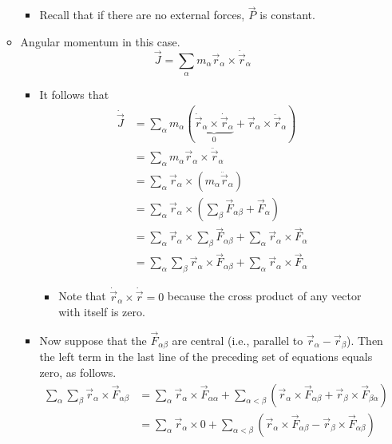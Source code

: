 \documentclass[../notes.tex]{subfiles}
\begin{document}
\begin{itemize}
\begin{itemize}
\begin{itemize}
            \item Recall that if there are no external forces, $\vec{P}$ is constant.
        \end{itemize}
        \item Angular momentum in this case.
        \begin{equation*}
            \vec{J} = \sum_\alpha m_\alpha\vec{r}_\alpha\times\dot{\vec{r}}_\alpha
        \end{equation*}
        \begin{itemize}
            \item It follows that
            \begin{align*}
                \dot{\vec{J}} &= \sum_\alpha m_\alpha(\underbrace{\dot{\vec{r}}_\alpha\times\dot{\vec{r}}_\alpha}_0+\vec{r}_\alpha\times\ddot{\vec{r}}_\alpha)\\
                &= \sum_\alpha m_\alpha\vec{r}_\alpha\times\ddot{\vec{r}}_\alpha\\
                &= \sum_\alpha\vec{r}_\alpha\times(m_\alpha\ddot{\vec{r}}_\alpha)\\
                &= \sum_\alpha\vec{r}_\alpha\times\left( \sum_\beta\vec{F}_{\alpha\beta}+\vec{F}_\alpha \right)\\
                &= \sum_\alpha\vec{r}_\alpha\times\sum_\beta\vec{F}_{\alpha\beta}+\sum_\alpha\vec{r}_\alpha\times\vec{F}_\alpha\\
                &= \sum_\alpha\sum_\beta\vec{r}_\alpha\times\vec{F}_{\alpha\beta}+\sum_\alpha\vec{r}_\alpha\times\vec{F}_\alpha
            \end{align*}
            \begin{itemize}
                \item Note that $\dot{\vec{r}}_\alpha\times\dot{\vec{r}}=0$ because the cross product of any vector with itself is zero.
            \end{itemize}
            \item Now suppose that the $\vec{F}_{\alpha\beta}$ are central (i.e., parallel to $\vec{r}_\alpha-\vec{r}_\beta$). Then the left term in the last line of the preceding set of equations equals zero, as follows.
            \begin{align*}
                \sum_\alpha\sum_\beta\vec{r}_\alpha\times\vec{F}_{\alpha\beta} &= \sum_\alpha\vec{r}_\alpha\times\vec{F}_{\alpha\alpha}+\sum_{\alpha<\beta}(\vec{r}_\alpha\times\vec{F}_{\alpha\beta}+\vec{r}_\beta\times\vec{F}_{\beta\alpha})\\
                &= \sum_\alpha\vec{r}_\alpha\times 0+\sum_{\alpha<\beta}(\vec{r}_\alpha\times\vec{F}_{\alpha\beta}-\vec{r}_\beta\times\vec{F}_{\alpha\beta})\\

\end{align*}
\end{itemize}
\end{itemize}
\end{itemize}
\end{document}
